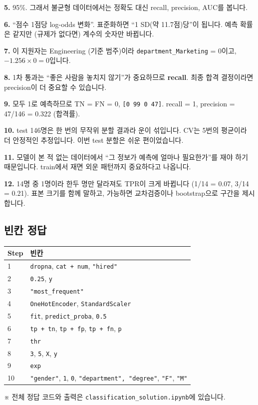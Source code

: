 \documentclass[11pt,a4paper]{article}
\newcommand{\code}[1]{\texttt{#1}}
\newcommand{\aside}[1]{{\footnotesize\color{black!65}#1}}
\begin{document}
\textbf{5.} 95\%. 그래서 불균형 데이터에서는 정확도 대신 recall, precision, AUC를 봅니다.

\textbf{6.} ``점수 1점당 log-odds 변화''. 표준화하면 ``1 SD(약 11.7점)당''이 됩니다. 예측 확률은 같지만 (규제가 없다면) 계수의 숫자만 바뀝니다.

\textbf{7.} 이 지원자는 Engineering (기준 범주)이라 \code{department\_Marketing} = 0이고, $-1.256\times0=0$입니다.

\textbf{8.} 1차 통과는 ``좋은 사람을 놓치지 않기''가 중요하므로 \textbf{recall}. 최종 합격 결정이라면 precision이 더 중요할 수 있습니다.

\textbf{9.} 모두 1로 예측하므로 TN = FN = 0, \code{[0 99 0 47]}. recall = 1, precision = 47/146 = 0.322 (합격률).

\textbf{10.} test 146명은 한 번의 무작위 분할 결과라 운이 섞입니다. CV는 5번의 평균이라 더 안정적인 추정입니다. 이번 test 분할은 쉬운 편이었습니다.

\textbf{11.} 모델이 본 적 없는 데이터에서 ``그 정보가 예측에 얼마나 필요한가''를 재야 하기 때문입니다. train에서 재면 외운 패턴까지 중요하다고 나옵니다.

\textbf{12.} 14명 중 1명이라 한두 명만 달라져도 TPR이 크게 바뀝니다 (1/14 = 0.07, 3/14 = 0.21). 표본 크기를 함께 말하고, 가능하면 교차검증이나 bootstrap으로 구간을 제시합니다.

\subsection{빈칸 정답}
\begin{center}\small
\begin{tabular}{@{}l l@{}}
\toprule
Step & 빈칸 \\
\midrule
1 & \code{dropna}, \code{cat + num}, \code{"hired"} \\
2 & \code{0.25}, \code{y} \\
3 & \code{"most\_frequent"} \\
4 & \code{OneHotEncoder}, \code{StandardScaler} \\
5 & \code{fit}, \code{predict\_proba}, \code{0.5} \\
6 & \code{tp + tn}, \code{tp + fp}, \code{tp + fn}, \code{p} \\
7 & \code{thr} \\
8 & \code{3}, \code{5}, \code{X}, \code{y} \\
9 & \code{exp} \\
10 & \code{"gender"}, \code{1}, \code{0}, \code{"department", "degree"}, \code{"F"}, \code{"M"} \\
\bottomrule
\end{tabular}
\end{center}
\aside{※ 전체 정답 코드와 출력은 \code{classification\_solution.ipynb}에 있습니다.}
\end{document}
